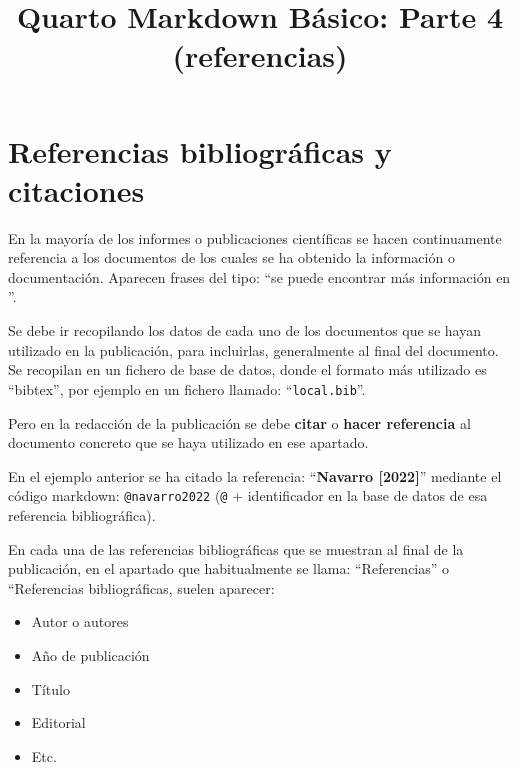 \documentclass[
  11pt,
  a4paper,
  DIV=11,
  numbers=noendperiod]{scrartcl}
\title{Quarto Markdown Básico: Parte 4 (referencias)}
\author{}
\date{}
\providecommand{\tightlist}{%
  \setlength{\itemsep}{0pt}\setlength{\parskip}{0pt}}\usepackage{longtable,booktabs,array}
\renewcommand*\contentsname{Tabla de contenidos}
\newcommand\contentsname{Tabla de contenidos}
\theoremstyle{definition}
\theoremstyle{remark}
\begin{document}
\maketitle

\renewcommand*\contentsname{Tabla de contenidos}
{
\hypersetup{linkcolor=}
\setcounter{tocdepth}{3}
\tableofcontents
}

\section{Referencias bibliográficas y
citaciones}\label{referencias-bibliogruxe1ficas-y-citaciones}

En la mayoría de los informes o publicaciones científicas se hacen
continuamente referencia a los documentos de los cuales se ha obtenido
la información o documentación. Aparecen frases del tipo: ``se puede
encontrar más información en \citet{navarro2022}''.

Se debe ir recopilando los datos de cada uno de los documentos que se
hayan utilizado en la publicación, para incluirlas, generalmente al
final del documento. Se recopilan en un fichero de base de datos, donde
el formato más utilizado es ``bibtex'', por ejemplo en un fichero
llamado: ``\texttt{local.bib}''.

Pero en la redacción de la publicación se debe \textbf{citar} o
\textbf{hacer referencia} al documento concreto que se haya utilizado en
ese apartado.

En el ejemplo anterior se ha citado la referencia: ``\textbf{Navarro
{[}2022{]}}'' mediante el código markdown: \texttt{@navarro2022}
(\texttt{@} + identificador en la base de datos de esa referencia
bibliográfica).

En cada una de las referencias bibliográficas que se muestran al final
de la publicación, en el apartado que habitualmente se llama:
``Referencias'' o ``Referencias bibliográficas, suelen aparecer:

\begin{itemize}
\tightlist
\item
  Autor o autores
\item
  Año de publicación
\item
  Título
\item
  Editorial
\item
  Etc.
\end{itemize}
\end{document}
